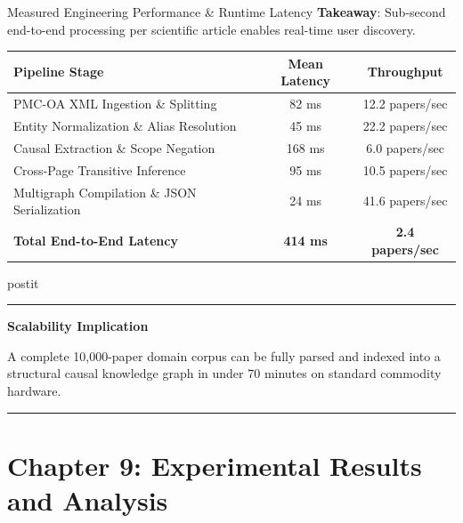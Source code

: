 \documentclass[aspectratio=43,10pt]{beamer}
\newcommand{\card}[4][\linewidth]{%
  \begin{beamercolorbox}[wd=#1,sep=0pt,rounded=false,shadow=false]{postit}%
    {\color{#3}\rule{\linewidth}{1.5pt}}\par
    \colorbox{slatebg}{%
      \begin{minipage}{\dimexpr#1-8pt\relax}%
        \vspace{1.5pt}%
        {\footnotesize\bfseries\color{#3}#2}\vspace{1.5pt}\par%
        {\scriptsize\color{darktext}#4}%
        \vspace{1.5pt}%
      \end{minipage}%
    }%
    \par{\color{bordergray}\rule{\linewidth}{0.6pt}}%
  \end{beamercolorbox}%
}
\begin{document}
\begin{frame}{Measured Engineering Performance \& Runtime Latency}
  \textbf{Takeaway}: Sub-second end-to-end processing per scientific article enables real-time user discovery.
  \vspace{0.10cm}
  \begin{center}
    \scriptsize
    \renewcommand{\arraystretch}{1.10}
    \begin{tabularx}{0.98\linewidth}{Xcc}
      \toprule
      \textbf{\color{navy}Pipeline Stage} & \textbf{\color{navy}Mean Latency} & \textbf{\color{navy}Throughput} \\
      \midrule
      PMC-OA XML Ingestion \& Splitting & 82 ms & 12.2 papers/sec \\
      Entity Normalization \& Alias Resolution & 45 ms & 22.2 papers/sec \\
      Causal Extraction \& Scope Negation & 168 ms & 6.0 papers/sec \\
      Cross-Page Transitive Inference & 95 ms & 10.5 papers/sec \\
      Multigraph Compilation \& JSON Serialization & 24 ms & 41.6 papers/sec \\
      \midrule
      \textbf{\color{navy}Total End-to-End Latency} & \textbf{414 ms} & \textbf{2.4 papers/sec} \\
      \bottomrule
    \end{tabularx}
  \end{center}
  \vspace{0.06cm}
  \card{Scalability Implication}{teal}{
    A complete 10,000-paper domain corpus can be fully parsed and indexed into a structural causal knowledge graph in under 70 minutes on standard commodity hardware.
  }
\end{frame}

\section{Chapter 9: Experimental Results and Analysis}
\end{document}
